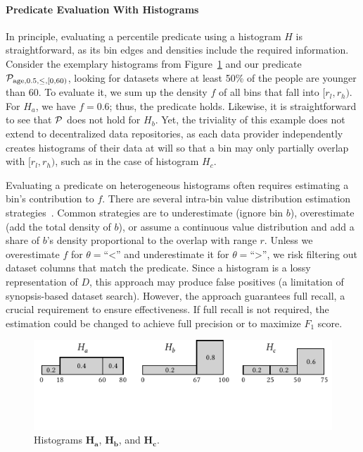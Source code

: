 \paragraph{Predicate Evaluation With Histograms}
In principle, evaluating a percentile predicate using a histogram $H$ is straightforward, as its bin edges and densities include the required information.
Consider the exemplary histograms from Figure~\ref{fig:example_histograms_1} and our predicate $\mathcal{P}_{\text{age}, 0.5, \leq, [0, 60)}$, looking for datasets where at least 50\% of the people are younger than 60.
To evaluate it, we sum up the density $f$ of all bins that fall into $[r_l, r_h)$.
For $H_a$, we have $f=0.6$; thus, the predicate holds.
Likewise, it is straightforward to see that $\mathcal{P}$ does not hold for $H_b$.
Yet, the triviality of this example does not extend to decentralized data repositories, as each data provider independently creates histograms of their data at will so that a bin may only partially overlap with $[r_l, r_h)$, such as in the case of histogram $H_c$.

Evaluating a predicate on heterogeneous histograms often requires estimating a bin's contribution to $f$.
There are several intra-bin value distribution estimation strategies~\cite{cormode_synopses_2011}.
Common strategies are to underestimate (ignore bin $b$), overestimate (add the total density of $b$), or assume a continuous value distribution and add a share of $b$'s density proportional to the overlap with range $r$.
Unless we overestimate $f$ for $\theta =$``<'' and underestimate it for $\theta =$``>'', we risk filtering out dataset columns that match the predicate.
Since a histogram is a lossy representation of $D$, this approach may produce false positives (a limitation of synopsis-based dataset search).
However, the approach guarantees full recall, a crucial requirement to ensure effectiveness.
If full recall is not required, the estimation could be changed to achieve full precision or to maximize $F_1$ score.

\begin{figure}[t]
    \centering
    \includegraphics[trim=0 1.35cm 0 0]{figures/diagrams/example_histograms.pdf}
    \caption{Histograms $\boldsymbol{H_a}$, $\boldsymbol{H_b}$, and $\boldsymbol{H_c}$.}
    \label{fig:example_histograms_1}
\end{figure}

